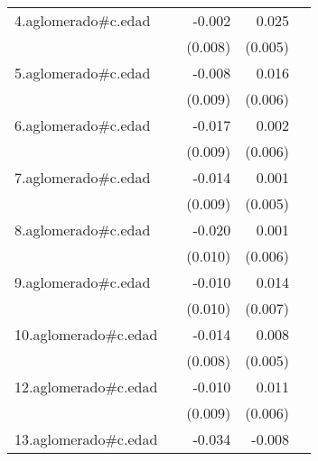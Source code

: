 {\begin{longtable}{l*{4}{D{.}{.}{-1}}}
\addlinespace
4.aglomerado#c.edad&                     &      -0.002         &       0.025\sym{***}&                     \\
            &                     &     (0.008)         &     (0.005)         &                     \\
\addlinespace
5.aglomerado#c.edad&                     &      -0.008         &       0.016\sym{**} &                     \\
            &                     &     (0.009)         &     (0.006)         &                     \\
\addlinespace
6.aglomerado#c.edad&                     &      -0.017         &       0.002         &                     \\
            &                     &     (0.009)         &     (0.006)         &                     \\
\addlinespace
7.aglomerado#c.edad&                     &      -0.014         &       0.001         &                     \\
            &                     &     (0.009)         &     (0.005)         &                     \\
\addlinespace
8.aglomerado#c.edad&                     &      -0.020\sym{*}  &       0.001         &                     \\
            &                     &     (0.010)         &     (0.006)         &                     \\
\addlinespace
9.aglomerado#c.edad&                     &      -0.010         &       0.014         &                     \\
            &                     &     (0.010)         &     (0.007)         &                     \\
\addlinespace
10.aglomerado#c.edad&                     &      -0.014         &       0.008         &                     \\
            &                     &     (0.008)         &     (0.005)         &                     \\
\addlinespace
12.aglomerado#c.edad&                     &      -0.010         &       0.011         &                     \\
            &                     &     (0.009)         &     (0.006)         &                     \\
\addlinespace
13.aglomerado#c.edad&                     &      -0.034\sym{***}&      -0.008         &                     \\

\end{longtable}}
